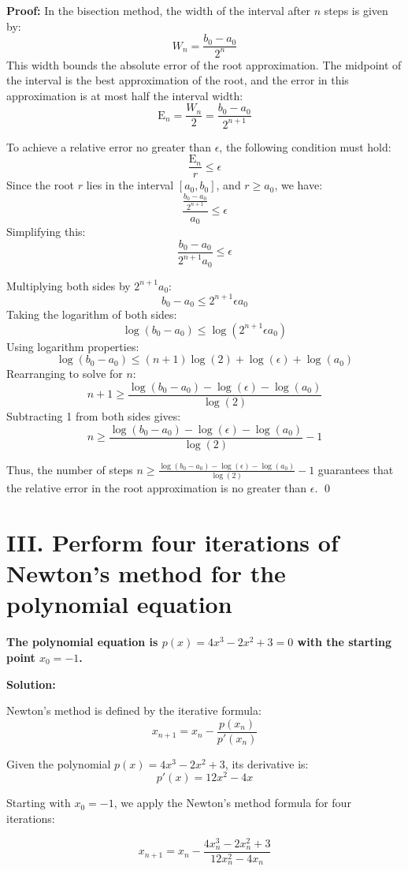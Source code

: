 \documentclass[a4paper]{article}
\begin{document}
\textbf{Proof:}
In the bisection method, the width of the interval after $n$ steps is given by:
   \[
   W_n = \frac{b_0 - a_0}{2^n}
   \]
This width bounds the absolute error of the root approximation. The midpoint of the interval is the best approximation of the root, and the error in this approximation is at most half the interval width:
   \[
   \text{E}_n = \frac{W_n}{2} = \frac{b_0 - a_0}{2^{n+1}}
   \]


To achieve a relative error no greater than $\epsilon$, the following condition must hold:
   \[
   \frac{\text{E}_n}{r} \leq \epsilon
   \]
   Since the root $r$ lies in the interval $[a_0, b_0]$, and $r \geq a_0$, we have:
   \[
   \frac{\frac{b_0 - a_0}{2^{n+1}}}{a_0} \leq \epsilon
   \]
   Simplifying this:
   \[
   \frac{b_0 - a_0}{2^{n+1} a_0} \leq \epsilon
   \]
   

Multiplying both sides by $2^{n+1} a_0$:
   \[
   b_0 - a_0 \leq 2^{n+1} \epsilon a_0
   \]
   Taking the logarithm of both sides:
   \[
   \log(b_0 - a_0) \leq \log(2^{n+1} \epsilon a_0)
   \]
   Using logarithm properties:
   \[
   \log(b_0 - a_0) \leq (n+1) \log(2) + \log(\epsilon) + \log(a_0)
   \]
   Rearranging to solve for $n$:
   \[
   n+1 \geq \frac{\log(b_0 - a_0) - \log(\epsilon) - \log(a_0)}{\log(2)}
   \]
   Subtracting 1 from both sides gives:
   \[
   n \geq \frac{\log(b_0 - a_0) - \log(\epsilon) - \log(a_0)}{\log(2)} - 1
   \]


Thus, the number of steps $n \geq \frac{\log(b_0 - a_0) - \log(\epsilon) - \log(a_0)}{\log(2)} - 1$ guarantees that the relative error in the root approximation is no greater than $\epsilon$. 
\qed

\section*{III. Perform four iterations of Newton’s method for the polynomial equation }
\textbf{The polynomial equation is $p(x) = 4x^3 - 2x^2 + 3 = 0$ with the starting point $x_0 = -1$.}

\textbf{Solution:}

Newton's method is defined by the iterative formula:
\[
x_{n+1} = x_n - \frac{p(x_n)}{p'(x_n)}
\]

Given the polynomial \( p(x) = 4x^3 - 2x^2 + 3 \), its derivative is:
\[
p'(x) = 12x^2 - 4x
\]

Starting with \( x_0 = -1 \), we apply the Newton's method formula for four iterations:

\[
x_{n+1} = x_n - \frac{4x_n^3 - 2x_n^2 + 3}{12x_n^2 - 4x_n}
\]
\end{document}

